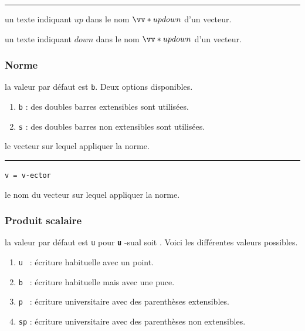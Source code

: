 \documentclass[12pt,a4paper]{book}
\makeatletter
\theoremstyle{definition}
\newcommand\separation{
	\medskip
	\hfill\rule{0.5\textwidth}{0.75pt}\hfill
	\medskip
}
\newcommand\whyprefix[2]{%
	\textbf{\prefix{#1}}-#2%
}
\newcommand\mwhyprefix[2]{%
	\texttt{#1 = #1-#2}%
}
\newcommand\prefix[1]{%
	\texttt{#1}%
}
\newcommand\inenglish{\@ifstar{\@inenglish@star}{\@inenglish@no@star}}
\newcommand\@inenglish@star[1]{%
	\emph{\og #1 \fg}%
}
\newcommand\@inenglish@no@star[1]{%
	\@inenglish@star{#1} en anglais%
}
\makeatother
\begin{document}
{{\separation



 un texte indiquant $up$ dans le nom $\vect*{up}{down}$ d'un vecteur.

 un texte indiquant $down$ dans le nom $\vect*{up}{down}$ d'un vecteur.


\subsubsection{Norme}




\IDoption{} la valeur par défaut est \verb+b+. Deux options disponibles.
\begin{enumerate}
	\item \verb+b+ : des doubles barres extensibles sont utilisées.

	\item \verb+s+ : des doubles barres non extensibles sont utilisées.
\end{enumerate}


\IDarg{} le vecteur sur lequel appliquer la norme.


\separation

 \hfill \mwhyprefix{v}{ector}

\IDarg{} le nom du vecteur sur lequel appliquer la norme.


\subsubsection{Produit scalaire}




\IDoption{} la valeur par défaut est \verb+u+ pour \whyprefix{u}{sual} soit \inenglish{habituel}.  Voici les différentes valeurs possibles.

\begin{enumerate}
	\item \verb+u + : écriture habituelle avec un point.

	\item \verb+b + : écriture habituelle mais avec une puce.

	\medskip
	
	\item \verb+p + : écriture \og universitaire \fg{} avec des parenthèses extensibles.

	\item \verb+sp+ : écriture \og universitaire \fg{} avec des parenthèses non extensibles.


\end{enumerate}}}
\end{document}

